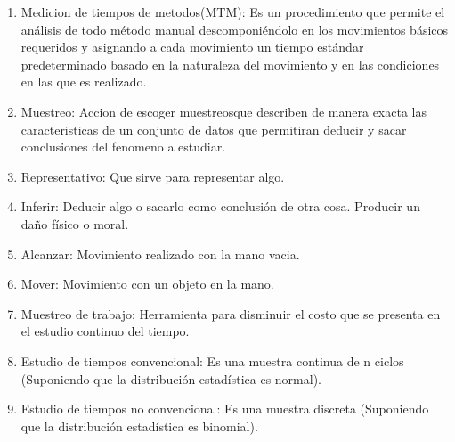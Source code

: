 \begin{enumerate}
    \item Medicion de tiempos de metodos(MTM): Es un procedimiento que permite el análisis de todo método manual descomponiéndolo en los movimientos básicos requeridos y asignando a cada movimiento un tiempo estándar predeterminado basado en la naturaleza del movimiento y en las condiciones en las que es realizado.
    \item Muestreo: Accion de escoger muestreosque describen de manera exacta las caracteristicas de un conjunto de datos que permitiran deducir y sacar conclusiones del fenomeno a estudiar.
    \item Representativo: Que sirve para representar algo.
    \item Inferir:  Deducir algo o sacarlo como conclusión de otra cosa. Producir un daño físico o moral.
    \cite{asalerae2023}
    \item Alcanzar: Movimiento realizado con la mano vacia.
    \cite{asale_rae_2023}
    \item Mover: Movimiento con un objeto en la mano.
    \item Muestreo de trabajo: Herramienta para disminuir el costo que se presenta en el estudio continuo del tiempo.
    \item Estudio de tiempos convencional: Es una muestra continua de n ciclos (Suponiendo que la distribución estadística es normal).
    \item Estudio de tiempos no convencional: Es una muestra discreta (Suponiendo que la distribución estadística es binomial).
\end{enumerate}

